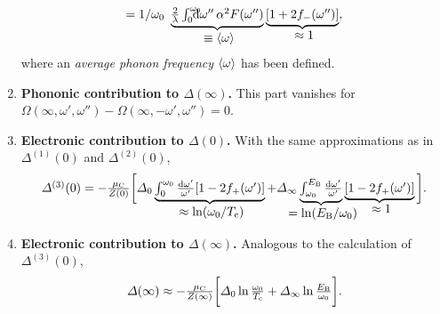 \begin{enumerate}
\begin{gather*}
            {= 1 / \omega_0} \
        \hypo
            {\frac 2 \lambda \int \from 0 \till{\omega_0} \D \omega'' \,
            \alpha^2 F(\omega'')}{\equiv \av \omega}
        \hypo{[1 + 2 f_-(\omega'')]}{\approx 1},
    \end{gather*}
    where an \emph{average phonon frequency} $\langle\omega\rangle$ has been defined.
    \item \textbf{Phononic contribution to \bm$\Delta(\infty)$.} This part
    vanishes for $\Omega(\infty, \omega', \omega'') - \Omega(\infty, -\omega',
    \omega'') = 0$.
    \item \textbf{Electronic contribution to \bm$\Delta(0)$.} With the same
    approximations as in $\Delta^{(1)}(0)$ and $\Delta^{(2)}(0)$,
    \begin{equation*}
        \Delta^{(3)}(0) = -\frac{\mu \sub C}{Z(0)} \bigg[
            \Delta_0 \hypo
                { \int_0^{\omega_0} \frac{\D \omega'}{\omega'}
                [1 - 2 f_+(\omega')] }
                {\approx \ln(\omega_0 / T \sub c)}
            + \Delta_\infty \hypo
                {\int_{\omega_0}^{E \sub B}
                \frac{\D \omega'}{\omega'}}{= \ln(E \sub B / \omega_0)}
            \hypo{[1 - 2 f_+(\omega')]}{\approx 1}
        \bigg].
    \end{equation*}
    \item \textbf{Electronic contribution to \bm$\Delta(\infty)$.} Analogous to
    the calculation of $\Delta^{(3)}(0)$,
    \begin{equation*}
        \Delta(\infty) \approx -\frac{\mu \sub C}{Z(\infty)} \bigg[
            \Delta_0 \ln \frac{\omega_0}{T \sub c}
            + \Delta_\infty \ln \frac{E \sub B}{\omega_0}
        \bigg].
    \end{equation*}
\end{enumerate}

